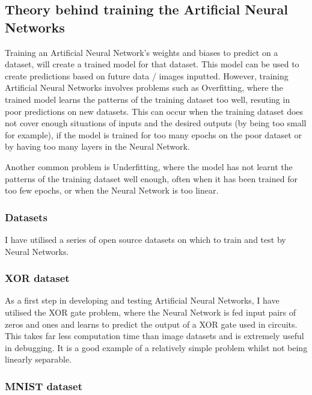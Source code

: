 \documentclass[./project-report/src/latex/project-report.tex]{subfiles}
\begin{document}
\subsection{Theory behind training the Artificial Neural Networks}

Training an Artificial Neural Network's weights and biases to predict on a dataset, will create a trained model for that dataset. This model can be used to create 
predictions based on future data / images inputted. However, training Artificial Neural Networks involves problems such as Overfitting, where the trained model learns 
the patterns of the training dataset too well, resuting in poor predictions on new datasets. This can occur when the training dataset does not cover enough situations 
of inputs and the desired outputs (by being too small for example), if the model is trained for too many epochs on the poor dataset or by having too many layers in the 
Neural Network.

Another common problem is Underfitting, where the model has not learnt the patterns of the training dataset well enough, often when it has been trained for too few 
epochs, or when the Neural Network is too linear.

\subsubsection{Datasets}

I have utilised a series of open source datasets on which to train and test by Neural Networks.

\subsubsection{XOR dataset}

As a first step in developing and testing Artificial Neural Networks, I have utilised the XOR gate problem, where the Neural Network is fed input pairs of zeros and 
ones and learns  to predict the output of a XOR gate used in circuits. This takes far less computation time than image datasets and is extremely useful in debugging. 
It is a good example of a relatively simple problem whilst not being linearly separable.

\subsubsection{MNIST dataset}
\end{document}
